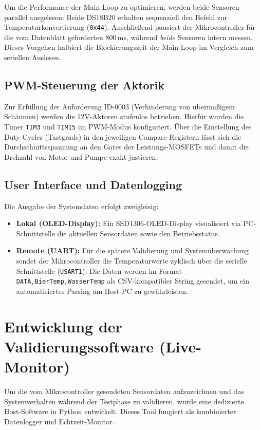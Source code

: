 Um die Performance der Main-Loop zu optimieren, werden beide Sensoren parallel ausgelesen: Beide DS18B20 erhalten sequenziell den Befehl zur Temperaturkonvertierung (\texttt{0x44}). Anschließend pausiert der Mikrocontroller für die vom Datenblatt \cite{ds18b20_datasheet} geforderten 800\,ms, während \textit{beide} Sensoren intern messen. Dieses Vorgehen halbiert die Blockierungszeit der Main-Loop im Vergleich zum seriellen Auslesen.

\subsection{PWM-Steuerung der Aktorik}
Zur Erfüllung der Anforderung ID-0003 (Verhinderung von übermäßigem Schäumen) werden die 12V-Aktoren stufenlos betrieben. Hierfür wurden die Timer \texttt{TIM3} und \texttt{TIM15} im PWM-Modus konfiguriert. Über die Einstellung des Duty-Cycles (Tastgrads) in den jeweiligen Compare-Registern lässt sich die Durchschnittsspannung an den Gates der Leistungs-MOSFETs und damit die Drehzahl von Motor und Pumpe exakt justieren.

\subsection{User Interface und Datenlogging}
Die Ausgabe der Systemdaten erfolgt zweigleisig:
\begin{itemize}
	\item \textbf{Lokal (OLED-Display):} Ein SSD1306-OLED-Display visualisiert via I²C-Schnittstelle die aktuellen Sensordaten sowie den Betriebsstatus.
	\item \textbf{Remote (UART):} Für die spätere Validierung und Systemüberwachung sendet der Mikrocontroller die Temperaturwerte zyklisch über die serielle Schnittstelle (\texttt{USART1}). Die Daten werden im Format \texttt{DATA,BierTemp,WasserTemp} als CSV-kompatibler String gesendet, um ein automatisiertes Parsing am Host-PC zu gewährleisten.
\end{itemize}

\section{Entwicklung der Validierungssoftware (Live-Monitor)}
Um die vom Mikrocontroller gesendeten Sensordaten aufzuzeichnen und das Systemverhalten während der Testphase zu validieren, wurde eine dedizierte Host-Software in Python entwickelt. Dieses Tool fungiert als kombinierter Datenlogger und Echtzeit-Monitor. 

